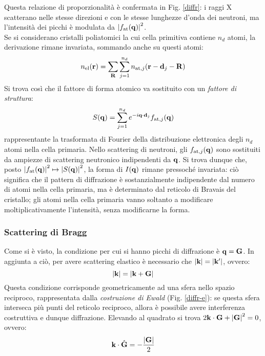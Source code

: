 Questa relazione di proporzionalità è confermata in Fig. \ref{diffr}: i raggi X scatterano nelle stesse direzioni e con le stesse lunghezze d'onda dei neutroni, ma l'intensità dei picchi è modulata da $ \left\lvert f_\text{at}(\mathbf{q})\right\rvert^2 $. \\
Se si considerano cristalli poliatomici la cui cella primitiva contiene $ n_d $ atomi, la derivazione rimane invariata, sommando anche su questi atomi:
\begin{equation}
	n_\text{el}(\mathbf{r}) = \sum_{\mathbf{R}} \sum_{j = 1}^{n_d} n_{\text{at},j}(\mathbf{r} - \mathbf{d}_j - \mathbf{R})
\end{equation}
Si trova così che il fattore di forma atomico va sostituito con un \textit{fattore di struttura}:
\begin{equation}
	S(\mathbf{q}) = \sum_{j = 1}^{n_d} e^{-i \mathbf{q} \cdot \mathbf{d}_j} f_{\text{at},j}(\mathbf{q})
\end{equation}
rappresentante la trasformata di Fourier della distribuzione elettronica degli $ n_d $ atomi nella cella primaria. Nello scattering di neutroni, gli $ f_{\text{at},j}(\mathbf{q}) $ sono sostituiti da ampiezze di scattering neutronico indipendenti da $ \mathbf{q} $. Si trova dunque che, posto $ \left\lvert f_\text{at}(\mathbf{q})\right\rvert^2 \mapsto \left\lvert S(\mathbf{q})\right\rvert^2 $, la forma di $ I(\mathbf{q}) $ rimane pressoché invariata: ciò significa che il pattern di diffrazione è sostanzialmente indipendente dal numero di atomi nella cella primaria, ma è determinato dal reticolo di Bravais del cristallo; gli atomi nella cella primaria vanno soltanto a modificare moltiplicativamente l'intensità, senza modificarne la forma.

\subsubsection{Scattering di Bragg}

Come si è visto, la condizione per cui si hanno picchi di diffrazione è $ \mathbf{q} = \mathbf{G} $. In aggiunta a ciò, per avere scattering elastico è necessario che $ \left\lvert\mathbf{k}\right\rvert = \left\lvert\mathbf{k}'\right\rvert $, ovvero:
\begin{equation}
	\left\lvert\mathbf{k}\right\rvert = \left\lvert\mathbf{k} + \mathbf{G}\right\rvert
	\label{eq:bragg-diffr}
\end{equation}
Questa condizione corrisponde geometricamente ad una sfera nello spazio reciproco, rappresentata dalla \textit{costruzione di Ewald} (Fig. \ref{diffr-e}): se questa sfera interseca più punti del reticolo reciproco, allora è possibile avere interferenza costruttiva e dunque diffrazione.
Elevando al quadrato si trova $ 2 \mathbf{k} \cdot \mathbf{G} + \left\lvert\mathbf{G}\right\rvert^2 = 0 $, ovvero:
\begin{equation}
	\mathbf{k} \cdot \hat{\mathbf{G}} = - \frac{\left\lvert\mathbf{G}\right\rvert}{2}
\end{equation}

